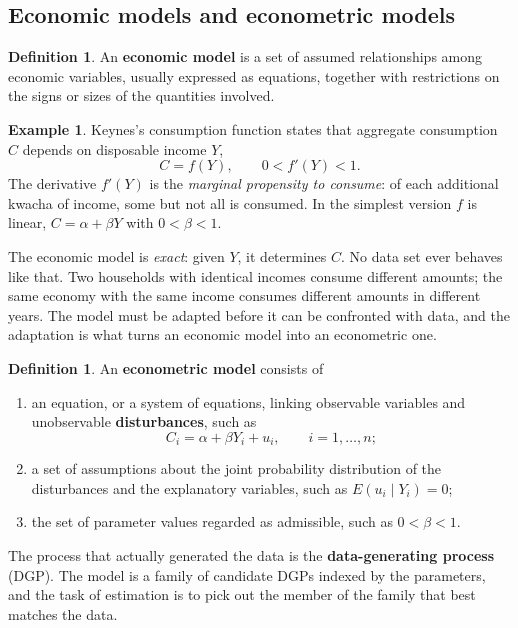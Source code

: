 \documentclass[11pt,a4paper]{article}
\numberwithin{equation}{section}
\theoremstyle{definition}
\newtheorem{defn}[thm]{Definition}
\newtheorem{exa}[thm]{Example}
\begin{document}
\subsection{Economic models and econometric models}
\label{ssec:models}

\begin{defn}
An \textbf{economic model} is a set of assumed relationships among economic variables, usually expressed as equations, together with
restrictions on the signs or sizes of the quantities involved.
\end{defn}

\begin{exa}
\label{ex:keynes}
Keynes's consumption function states that aggregate consumption $C$ depends on disposable income $Y$,
\[
C = f(Y), \qquad 0 < f'(Y) < 1 .
\]
The derivative $f'(Y)$ is the \emph{marginal propensity to consume}: of each additional kwacha of income, some but not all is consumed. In
the simplest version $f$ is linear, $C = \alpha + \beta Y$ with $0 < \beta < 1$.
\end{exa}

The economic model is \emph{exact}: given $Y$, it determines $C$. No data set ever behaves like that. Two households with identical incomes
consume different amounts; the same economy with the same income consumes different amounts in different years. The model must be adapted
before it can be confronted with data, and the adaptation is what turns an economic model into an econometric one.

\begin{defn}
An \textbf{econometric model} consists of
\begin{enumerate}[label=(\roman*)]
\item an equation, or a system of equations, linking observable variables and unobservable \textbf{disturbances}, such as
\[
C_i = \alpha + \beta Y_i + u_i , \qquad i = 1, \dots, n ;
\]
\item a set of assumptions about the joint probability distribution of the disturbances and the explanatory variables, such as
$E(u_i \mid Y_i) = 0$;
\item the set of parameter values regarded as admissible, such as $0 < \beta < 1$.
\end{enumerate}
The process that actually generated the data is the \textbf{data-generating process} (DGP). The model is a family of candidate DGPs indexed by
the parameters, and the task of estimation is to pick out the member of the family that best matches the data.
\end{defn}
\end{document}
